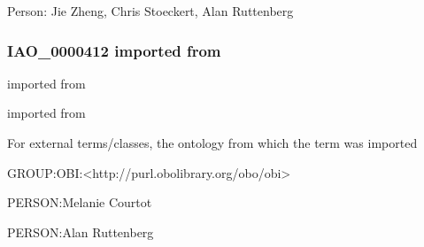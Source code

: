 \documentclass[letterpaper,10pt,english]{sphinxmanual}
\begin{document}
\begin{sphinxShadowBox}

\sphinxAtStartPar
Person: Jie Zheng, Chris Stoeckert, Alan Ruttenberg
\end{sphinxShadowBox}
\begin{quote}

\ignorespaces \end{quote}


\subsubsection{IAO\_0000412 \sphinxhyphen{} imported from}
\label{\detokenize{doc-IAO_0000412:iao-0000412-imported-from}}\label{\detokenize{doc-IAO_0000412:index-0}}\label{\detokenize{doc-IAO_0000412::doc}}
\begin{sphinxShadowBox}

\sphinxAtStartPar
imported from
\end{sphinxShadowBox}

\begin{sphinxShadowBox}

\sphinxAtStartPar
imported from
\end{sphinxShadowBox}

\begin{sphinxShadowBox}

\sphinxAtStartPar
For external terms/classes, the ontology from which the term was imported
\end{sphinxShadowBox}

\begin{sphinxShadowBox}

\sphinxAtStartPar
GROUP:OBI:\textless{}http://purl.obolibrary.org/obo/obi\textgreater{}
\end{sphinxShadowBox}

\begin{sphinxShadowBox}

\sphinxAtStartPar
PERSON:Melanie Courtot

\sphinxAtStartPar
PERSON:Alan Ruttenberg
\end{sphinxShadowBox}
\begin{quote}

\ignorespaces \end{quote}
\end{document}

